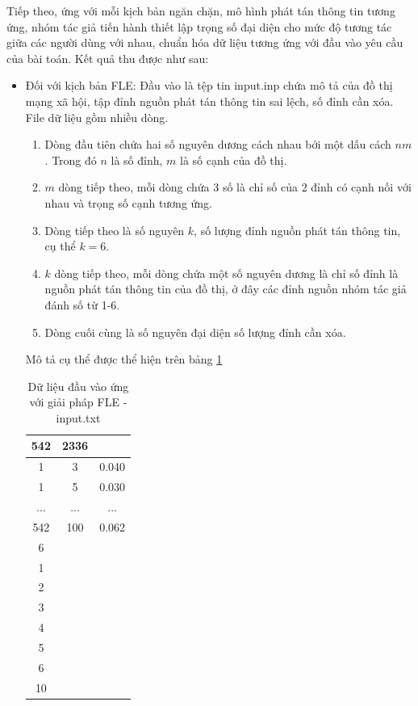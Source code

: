 Tiếp theo, ứng với mỗi kịch bản ngăn chặn, mô hình phát tán thông tin tương ứng, nhóm tác giả tiến hành thiết lập trọng số đại diện cho mức độ tương tác giữa các người dùng với nhau, chuẩn hóa dữ liệu tương ứng với đầu vào yêu cầu của bài toán. Kết quả thu được như sau:

\begin{itemize}
	\item Đối với kịch bản FLE: Đầu vào là tệp tin input.inp chứa mô tả của đồ thị mạng xã hội, tập đỉnh nguồn phát tán thông tin sai lệch, số đỉnh cần xóa.
	File dữ liệu gồm nhiều dòng. 
	\begin{enumerate}[+]
		\item Dòng đầu tiên chứa hai số nguyên dương cách nhau bởi một dấu cách $n m$. Trong đó $n$ là số đỉnh, $m$ là số cạnh của đồ thị.
		\item $m$ dòng tiếp theo, mỗi dòng chứa 3 số là chỉ số của 2 đỉnh có cạnh nối với nhau và trọng số cạnh tương ứng.
		\item Dòng tiếp theo là số nguyên $k$, số lượng đỉnh nguồn phát tán thông tin, cụ thể $k = 6$.
		\item $k$ dòng tiếp theo, mỗi dòng chứa một số nguyên dương là chỉ số đỉnh là nguồn phát tán thông tin của đồ thị, ở đây các đỉnh nguồn nhóm tác giả đánh số từ 1-6.
		\item Dòng cuối cùng là số nguyên đại diện số lượng đỉnh cần xóa.
	\end{enumerate}
	Mô tả cụ thể được thể hiện trên bảng \ref{bang4_3}
	
	\begin{table} [!htp]
		\centering
		\begin{tabular}{|c|c|c|}
			\hline 
			542 & 2336 & \\ 
			\hline 
			1 & 3 & 0.040\\ 
			\hline 
			1 & 5 & 0.030\\ 
			\hline 
			... & ... & ...\\ 
			\hline 
			542 & 100 & 0.062\\
			\hline
			6 & & \\
			\hline
			1 & & \\
			\hline
			2 & & \\
			\hline
			3 & & \\
			\hline
			4 & & \\
			\hline
			5 & & \\
			\hline
			6 & & \\
			\hline
			10 & & \\
			\hline 
		\end{tabular}
		\caption{Dữ liệu đầu vào ứng với giải pháp FLE - input.txt}
		\label{bang4_3} 
	\end{table}
	

\end{itemize}
